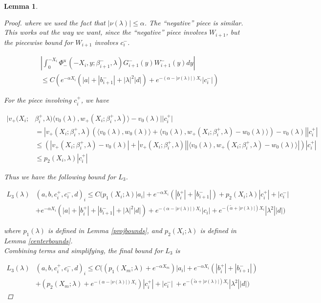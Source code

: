 \documentclass[12pt]{article}
\newtheorem{lemma}{Lemma}
\begin{document}
\begin{lemma}
\begin{proof}
where we used the fact that $|\nu(\lambda)| \leq \alpha$. The ``negative'' piece is similar. This works out the way we want, since the ``negative'' piece involves $W_{i+1}$, but the piecewise bound for $W_{i+1}$ involves $c_i^-$.

\begin{align*}
&\left| \int_0^{-X_i} \Phi^u_-(-X_i, y; \beta_{i+1}^-, \lambda) G_{i+1}^-(y) W_{i+1}^-(y) dy \right| \\
&\leq C \left( e^{-\alpha X_i} (|a| + |b_{i+1}^-| + |\lambda|^2 |d|) + e^{-(\alpha - |\nu(\lambda)|)X_i} |c_i^-| \right)
\end{align*}

For the piece involving $c_i^+$, we have

\begin{align*}
|v_+(X_i; &\beta_i^+, \lambda) \langle v_0(\lambda), w_+(X_i; \beta_i^+, \lambda) \rangle - v_0(\lambda) | |c_i^+| \\
&= |v_+(X_i; \beta_i^+, \lambda) (\langle v_0(\lambda), w_0(\lambda) \rangle + \langle v_0(\lambda), w_+(X_i; \beta_i^+, \lambda) - w_0(\lambda) \rangle) - v_0(\lambda) | |c_i^+| \\
&\leq (|v_+(X_i; \beta_i^+, \lambda) - v_0(\lambda)| 
+ |v_+(X_i; \beta_i^+, \lambda)||\langle v_0(\lambda), w_+(X_i; \beta_i^+, \lambda) - w_0(\lambda) \rangle|)|c_i^+| \\
&\leq p_2(X_i, \lambda)|c_i^+|
\end{align*}

Thus we have the following bound for $L_3$.

\begin{align*}
L_3(\lambda)&(a, b, c_i^+, c_i^-, d)_i \leq C ( p_1(X_i; \lambda)|a_i|
+ e^{-\alpha X_i}(|b_i^+| + |b_{i+1}^-|) + p_2(X_i; \lambda)|c_i^+| + |c_i^-| \\
&+ e^{-\alpha X_i}(|a| + |b_i^+| + |b_{i+1}^-| + |\lambda|^2 |d|) + e^{-(\alpha - |\nu(\lambda)|)X_i} |c_i| + e^{-(\tilde{\alpha}+|\nu(\lambda)|) X_i} |\lambda^2| |d| )
\end{align*}

where $p_1(\lambda)$ is defined in Lemma \ref{projbounds}, and $p_2(X_i; \lambda)$ is defined in Lemma \ref{centerbounds}.\\

Combining terms and simplifying, the final bound for $L_3$ is

\begin{align*}
L_3(\lambda)&(a, b, c_i^+, c_i^-, d)_i \leq C ( (p_1(X_m; \lambda) + e^{-\alpha X_m})|a_i|
+ e^{-\alpha X_i} (|b_i^+| + |b_{i+1}^-|) \\
&+ (p_2(X_m; \lambda) + e^{-(\alpha - |\nu(\lambda)|)X_i})|c_i^+| + |c_i^-| \
+ e^{-(\tilde{\alpha}+|\nu(\lambda)|) X_i} |\lambda^2| |d| )
\end{align*}


\end{proof}
\end{lemma}
\end{document}
